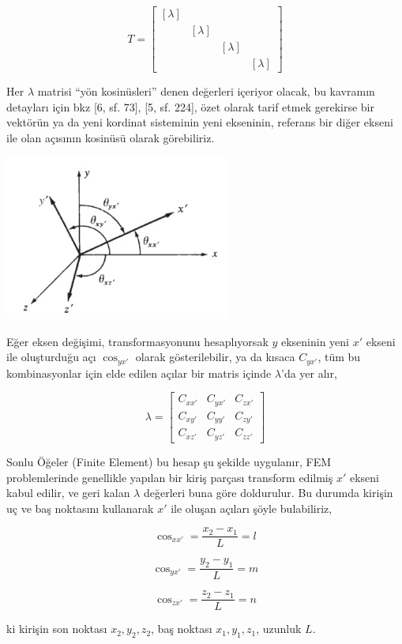 \documentclass[12pt,fleqn]{article}\usepackage{../../common}
\begin{document}
$$
T = \left[\begin{array}{cccc}
[\lambda] &  & & \\
 & [\lambda] & & \\
 & & [\lambda] & \\
 & & & [\lambda]
\end{array}\right]
$$

Her $\lambda$ matrisi ``yön kosinüsleri'' denen değerleri içeriyor olacak, bu
kavramın detayları için bkz [6, sf. 73], [5, sf. 224], özet olarak tarif etmek
gerekirse bir vektörün ya da yeni kordinat sisteminin yeni ekseninin, referans
bir diğer ekseni ile olan açısının kosinüsü olarak görebiliriz.

\includegraphics[width=20em]{phy_020_strs_11_04.jpg}

Eğer eksen değişimi, transformasyonunu hesaplıyorsak $y$ ekseninin yeni $x'$
ekseni ile oluşturduğu açı $\cos_{yx'}$ olarak gösterilebilir, ya da kısaca
$C_{yx'}$, tüm bu kombinasyonlar için elde edilen açılar bir matris içinde
$\lambda$'da yer alır,

$$
\lambda = \left[\begin{array}{ccc}
C_{xx'} & C_{yx'} & C_{zx'} \\
C_{xy'} & C_{yy'} & C_{zy'} \\
C_{xz'} & C_{yz'} & C_{zz'} 
\end{array}\right]
$$

Sonlu Öğeler (Finite Element) bu hesap şu şekilde uygulanır, FEM problemlerinde
genellikle yapılan bir kiriş parçası transform edilmiş $x'$ ekseni kabul edilir,
ve geri kalan $\lambda$ değerleri buna göre doldurulur. Bu durumda kirişin uç ve
baş noktasını kullanarak $x'$ ile oluşan açıları şöyle bulabiliriz,

$$
\cos_{xx'} = \frac{x_2 - x_1}{L} = l
$$

$$
\cos_{yx'} = \frac{y_2 - y_1}{L} = m
$$

$$
\cos_{zx'} = \frac{z_2 - z_1}{L} = n
$$

ki kirişin son noktası $x_2,y_2,z_2$, baş noktası $x_1,y_1,z_1$, uzunluk $L$.
\end{document}
